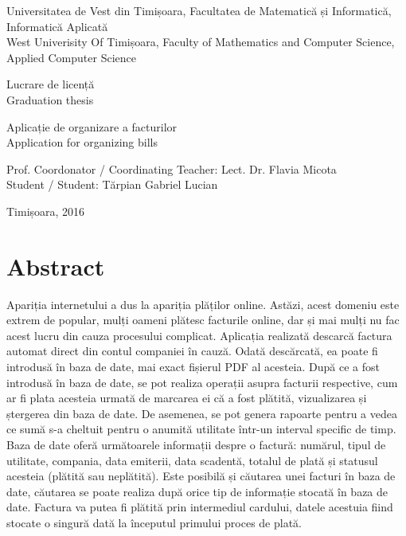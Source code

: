 \documentclass[12pt]{book}
\begin{document}
\thispagestyle{empty}
\begin{center}
	\begin{minipage}{0.75\linewidth}
		\centering
		{\Large Universitatea de Vest din Timișoara, Facultatea de Matematică și Informatică, Informatică Aplicată\\ West Univerisity Of Timișoara, Faculty of Mathematics and Computer Science, Applied Computer Science \par}
		\vspace{3cm}
		{\Huge Lucrare de licență\\ Graduation thesis\par}
		\vspace{2cm}
		{\Huge Aplicație de organizare a facturilor \\ Application for organizing bills \par}
		{\Large Prof. Coordonator / Coordinating Teacher: Lect. Dr. Flavia Micota  \\ Student / Student: Tărpian Gabriel Lucian\\ \par}
		\vspace{5cm}
		{\Large Timișoara, 2016}
	\end{minipage}
\end{center}
\clearpage

\tableofcontents
	
\chapter{Abstract}	

Apariția internetului a dus la apariția plăților online. Astăzi, acest domeniu este extrem de popular, mulți oameni plătesc facturile online, dar și mai mulți nu fac acest lucru din cauza procesului complicat. Aplicația realizată descarcă factura automat direct din contul companiei în cauză. Odată descărcată, ea poate fi introdusă în baza de date, mai exact fișierul PDF al acesteia. După ce a fost introdusă în baza de date, se pot realiza operații asupra facturii respective, cum ar fi plata acesteia urmată de marcarea ei că a fost plătită, vizualizarea și ștergerea din baza de date. De asemenea, se pot genera rapoarte pentru a vedea ce sumă s-a cheltuit pentru o anumită utilitate într-un interval specific de timp. Baza de date oferă următoarele informații despre o factură: numărul, tipul de utilitate, compania, data emiterii, data scadentă, totalul de plată și statusul acesteia (plătită sau neplătită). Este posibilă și căutarea unei facturi în baza de date, căutarea se poate realiza după orice tip de informație stocată în baza de date. Factura va putea fi plătită prin intermediul cardului, datele acestuia fiind stocate o singură dată la începutul primului proces de plată.
\end{document}
